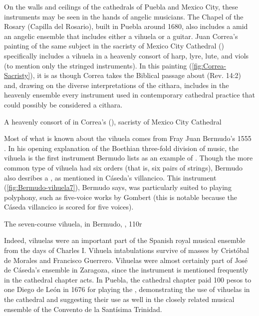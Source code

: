 On the walls and ceilings of the cathedrals of Puebla and Mexico City, these
instruments may be seen in the hands of angelic musicians.
The Chapel of the Rosary (Capilla del Rosario), built in Puebla around 1680,
also includes a  amid an angelic ensemble
that includes either a vihuela or a guitar.
Juan Correa's painting of the same subject in the sacristy of Mexico City
Cathedral () specifically includes a vihuela in a heavenly consort of
harp, lyre, lute, and viols (to mention only the stringed instruments).
In this painting (\cref{fig:Correa-Sacristy}), it is as though Correa takes the
Biblical passage about 
(Rev. 14:2) and, drawing on the diverse interpretations of the cithara, includes
in the heavenly ensemble every instrument used in contemporary cathedral
practice that could possibly be considered a cithara.

{A heavenly consort of  in Correa's  (), sacristy of Mexico City Cathedral}

Most of what is known about the vihuela comes from Fray Juan Bermudo's 1555
.
    \Autocite{Bermudo:Declaracion}
In his opening explanation of the Boethian three-fold division of music, the
vihuela is the first instrument Bermudo lists as an example of
 .
Though the more common type of vihuela had six orders (that is, six pairs of
strings), Bermudo also desribes a , as
mentioned in Cáseda's villancico.%
    \Autocite[90v--110r]{Bermudo:Declaracion}
This instrument (\cref{fig:Bermudo-vihuela7}), Bermudo says, was particularly
suited to playing polyphony, such as five-voice works by Gombert (this is
notable because the Cáseda villancico is scored for five voices).

{The seven-course vihuela, in Bermudo, , 110r}

Indeed, vihuelas were an important part of the Spanish royal musical ensemble
from the days of Charles I.
Vihuela intabulations survive of masses by Cristóbal de Morales and Francisco
Guerrero.%
    \autocite{Grove:Vihuela}
Vihuelas were almost certainly part of José de Cáseda's ensemble in Zaragoza,
since the instrument is mentioned frequently in the cathedral chapter acts.%
    \Autocite{Calahorra:Zaragoza2} %
In Puebla, the cathedral chapter paid 100 pesos to one Diego de León in 1676
for playing the , demonstrating the use of vihuelas in
the cathedral and suggesting their use as well in the closely related musical
ensemble of the Convento de la Santísima Trinidad.%
    \autocite[44]{PerezRuiz:Aportes} %

